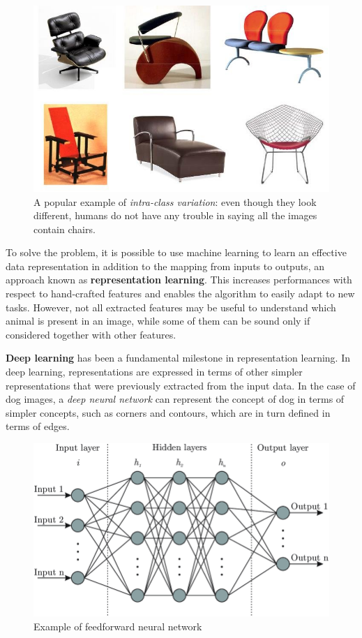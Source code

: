 \documentclass[%
    corpo=12pt,
    twoside,
    stile=classica,   
    tipotesi=magistrale,
    evenboxes,
    english,
	numerazioneromana,
]{toptesi}
\begin{document}
\begin{figure}[ht]
	\centering
	\includegraphics[width=.75\linewidth]{imgs/chairs.png}
	\caption{A popular example of \textit{intra-class variation}: even though they look different, humans do not have any trouble in saying all the images contain chairs.}
	\label{fig:intraclass}
\end{figure}

To solve the problem, it is possible to use machine learning to learn an effective data representation in addition to the mapping from inputs to outputs, an approach known as \textbf{representation learning}. This increases performances with respect to hand-crafted features and enables the algorithm to easily adapt to new tasks. However, not all extracted features may be useful to understand which animal is present in an image, while some of them can be sound only if considered together with other features.

\bigskip
\textbf{Deep learning} has been a fundamental milestone in representation learning. In deep learning, representations are expressed in terms of other simpler representations that were previously extracted from the input data. In the case of dog images, a \textit{deep neural network} can represent the concept of dog in terms of simpler concepts, such as corners and contours, which are in turn defined in terms of edges.

\begin{figure}[ht]
	\centering
	\includegraphics[width=.7\linewidth]{imgs/mlp.png}
	\caption{Example of feedforward neural network}
	\label{fig:mlp}
\end{figure}
\end{document}
